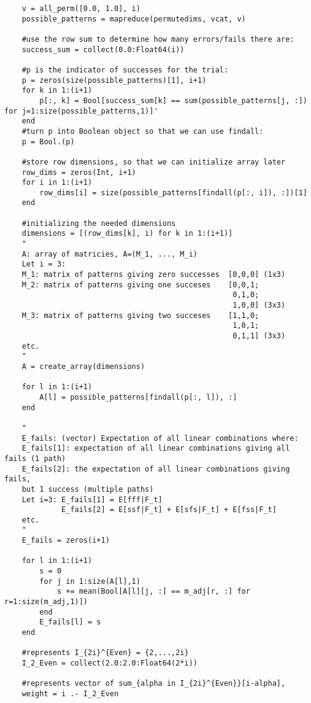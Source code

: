 \begin{verbatim}
    v = all_perm([0.0, 1.0], i)
    possible_patterns = mapreduce(permutedims, vcat, v)
    
    #use the row sum to determine how many errors/fails there are:
    success_sum = collect(0.0:Float64(i))
    
    #p is the indicator of successes for the trial:
    p = zeros(size(possible_patterns)[1], i+1)
    for k in 1:(i+1)
        p[:, k] = Bool[success_sum[k] == sum(possible_patterns[j, :]) for j=1:size(possible_patterns,1)]'
    end
    #turn p into Boolean object so that we can use findall:
    p = Bool.(p)

    #store row dimensions, so that we can initialize array later
    row_dims = zeros(Int, i+1)
    for i in 1:(i+1)
        row_dims[i] = size(possible_patterns[findall(p[:, i]), :])[1]
    end
    
    #initializing the needed dimensions
    dimensions = [(row_dims[k], i) for k in 1:(i+1)] 
    " 
    A: array of matricies, A=(M_1, ..., M_i)
    Let i = 3:
    M_1: matrix of patterns giving zero successes  [0,0,0] (1x3)
    M_2: matrix of patterns giving one succeses    [0,0,1;
                                                    0,1,0; 
                                                    1,0,0] (3x3)
    M_3: matrix of patterns giving two succeses    [1,1,0;
                                                    1,0,1;
                                                    0,1,1] (3x3)                                                
    etc. 
    "
    A = create_array(dimensions) 

    for l in 1:(i+1)
        A[l] = possible_patterns[findall(p[:, l]), :]
    end

    " 
    E_fails: (vector) Expectation of all linear combinations where: 
    E_fails[1]: expectation of all linear combinations giving all fails (1 path)
    E_fails[2]: the expectation of all linear combinations giving fails, 
    but 1 success (multiple paths)
    Let i=3: E_fails[1] = E[fff|F_t]
             E_fails[2] = E[ssf|F_t] + E[sfs|F_t] + E[fss|F_t]
    etc.
    "
    E_fails = zeros(i+1)

    for l in 1:(i+1)
        s = 0 
        for j in 1:size(A[l],1)
            s += mean(Bool[A[l][j, :] == m_adj[r, :] for r=1:size(m_adj,1)])
        end
        E_fails[l] = s
    end 
    
    #represents I_{2i}^{Even} = {2,...,2i}
    I_2_Even = collect(2.0:2.0:Float64(2*i))

    #represents vector of sum_{alpha in I_{2i}^{Even}}[i-alpha], 
    weight = i .- I_2_Even


\end{verbatim}

